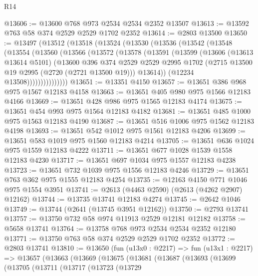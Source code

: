 \begin{lexlean}{R14}
\begin{coremodule}
@13606 := @13600 @768 @973 @2534 @2534 @2352 @13507
@13613 := @13592 @763 @58 @374 @2529 @2529 @1702 @2352
@13614 := @2803 @13500
@13650 := @13497
    (@13512
      (@13518
        (@13524
          (@13530
            (@13536
              (@13542
                (@13548
                  (@13554
                    (@13560
                      (@13566
                        (@13572
                          (@13578
                            (@13591
                              (@13599
                                (@13606
                                  (@13613 @13614 @5101)
                                  (@13600
                                    @396
                                    @374
                                    @2529
                                    @2529
                                    @2995
                                    @1702
                                    (@2715 @13500 @19 @2995 (@2720 (@2721 @13500 @19)))
                                    @13614))
                                (@12234 @13508)))))))))))))))
@13651 := @13351 @4150
@13657 := @13651 @386 @968 @975 @1567 @12183 @4158
@13663 := @13651 @405 @980 @975 @1566 @12183 @4166
@13669 := @13651 @428 @986 @975 @1565 @12183 @4174
@13675 := @13651 @454 @993 @975 @1564 @12183 @4182
@13681 := @13651 @485 @1000 @975 @1563 @12183 @4190
@13687 := @13651 @516 @1006 @975 @1562 @12183 @4198
@13693 := @13651 @542 @1012 @975 @1561 @12183 @4206
@13699 := @13651 @583 @1019 @975 @1560 @12183 @4214
@13705 := @13651 @636 @1024 @975 @1559 @12183 @4222
@13711 := @13651 @677 @1028 @1539 @1558 @12183 @4230
@13717 := @13651 @697 @1034 @975 @1557 @12183 @4238
@13723 := @13651 @732 @1039 @975 @1556 @12183 @4246
@13729 := @13651 @763 @362 @975 @1555 @12183 @4254
@13735 := @12163 @4150 @771 @1046 @975 @1554 @3951
@13741 := @2613 (@4463 @2590) (@2613 (@4262 @2907) @12162)
@13744 := @13735 @13741 @12183 @4274
@13745 := @2642 @1046
@13749 := @13744 (@2641 (@13745 @3951 @12162))
@13750 := @2793 @13741
@13757 := @13750 @732 @58 @974 @11913 @2529 @12181 @12182
@13758 := @5658 @13741
@13764 := @13758 @768 @973 @2534 @2534 @2352 @12180
@13771 := @13750 @763 @58 @374 @2529 @2529 @1702 @2352
@13772 := @2803 @13741
@13810 := @13650
    (fun (u13x0 : @2217) =>
    fun (u13x1 : @2217) =>
    @13657
      (@13663
        (@13669
          (@13675
            (@13681
              (@13687
                (@13693
                  (@13699
                    (@13705
                      (@13711
                        (@13717
                          (@13723
                            (@13729

\end{coremodule}
\end{lexlean}
